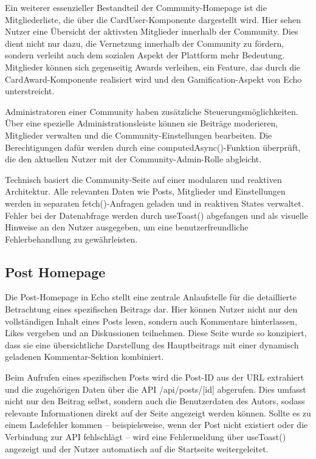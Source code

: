 \documentclass[a4paper,12pt]{article}
\begin{document}
Ein weiterer essenzieller Bestandteil der Community-Homepage ist die
Mitgliederliste, die über die CardUser-Komponente dargestellt wird. Hier sehen
Nutzer eine Übersicht der aktivsten Mitglieder innerhalb der Community. Dies
dient nicht nur dazu, die Vernetzung innerhalb der Community zu fördern,
sondern verleiht auch dem sozialen Aspekt der Plattform mehr Bedeutung.
Mitglieder können sich gegenseitig Awards verleihen, ein Feature, das durch die
CardAward-Komponente realisiert wird und den Gamification-Aspekt von Echo
unterstreicht.

Administratoren einer Community haben zusätzliche Steuerungsmöglichkeiten. Über
eine spezielle Administrationsleiste können sie Beiträge moderieren, Mitglieder
verwalten und die Community-Einstellungen bearbeiten. Die Berechtigungen dafür
werden durch eine computedAsync()-Funktion überprüft, die den aktuellen Nutzer
mit der Community-Admin-Rolle abgleicht.

Technisch basiert die Community-Seite auf einer modularen und reaktiven
Architektur. Alle relevanten Daten wie Posts, Mitglieder und Einstellungen
werden in separaten fetch()-Anfragen geladen und in reaktiven States verwaltet.
Fehler bei der Datenabfrage werden durch useToast() abgefangen und als visuelle
Hinweise an den Nutzer ausgegeben, um eine benutzerfreundliche Fehlerbehandlung
zu gewährleisten.

\subsection{Post Homepage}
Die Post-Homepage in Echo stellt eine zentrale Anlaufstelle für die
detaillierte Betrachtung eines spezifischen Beitrags dar. Hier können Nutzer
nicht nur den vollständigen Inhalt eines Posts lesen, sondern auch Kommentare
hinterlassen, Likes vergeben und an Diskussionen teilnehmen. Diese Seite wurde
so konzipiert, dass sie eine übersichtliche Darstellung des Hauptbeitrags mit
einer dynamisch geladenen Kommentar-Sektion kombiniert.

Beim Aufrufen eines spezifischen Posts wird die Post-ID aus der URL extrahiert
und die zugehörigen Daten über die API /api/posts/[id] abgerufen. Dies umfasst
nicht nur den Beitrag selbst, sondern auch die Benutzerdaten des Autors, sodass
relevante Informationen direkt auf der Seite angezeigt werden können. Sollte es
zu einem Ladefehler kommen – beispielsweise, wenn der Post nicht existiert oder
die Verbindung zur API fehlschlägt – wird eine Fehlermeldung über useToast()
angezeigt und der Nutzer automatisch auf die Startseite weitergeleitet.
\end{document}

